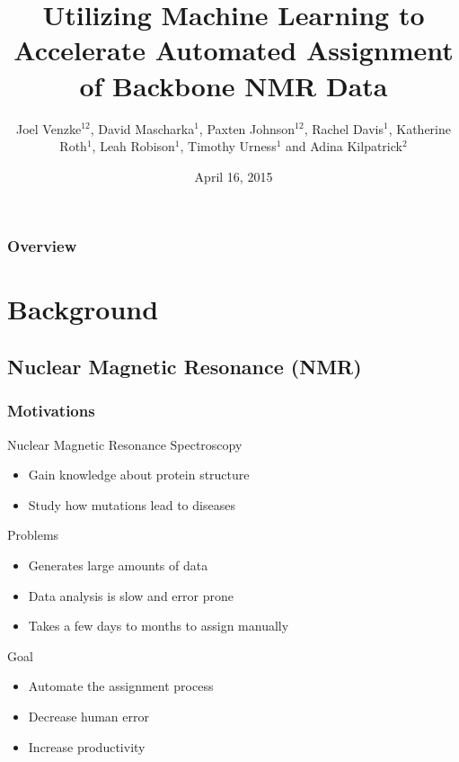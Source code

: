 \documentclass{beamer}
\title[NMR Assignment with Machine Learning]{Utilizing Machine Learning to Accelerate Automated
Assignment of Backbone NMR Data} %
\author[J. Venzke \\D. Mascharka \\P. Johnson \\R. Davis \\K. Roth\\ L. Robison\\ T. Urness \\A. Kilpatrick]{Joel Venzke$^{12}$, David Mascharka$^{1}$, Paxten Johnson$^{12}$, Rachel Davis$^{1}$, Katherine Roth$^{1}$,  Leah Robison$^{1}$, Timothy Urness$^{1}$ and Adina Kilpatrick$^{2}$} %
\institute[Drake University] %
{
$^1$Department of Mathematics and Computer Science\\
$^2$Department of Physics and Astronomy\\
Drake University\\

\medskip
\textit{joel.venzke@drake.edu} %
}
\date{April 16, 2015} %
\begin{document}
\begin{frame}
\titlepage %
\end{frame}

\begin{frame}
\frametitle{Overview} %
\tableofcontents 
\end{frame}

\section{Background}
\subsection[NMR]{Nuclear Magnetic Resonance (NMR)} 
\begin{frame}
	\frametitle{Motivations}
	\begin{block} {Nuclear Magnetic Resonance Spectroscopy}
		\begin{itemize}
			\item Gain knowledge about protein structure
			\item Study how mutations lead to diseases
		\end{itemize}
	\end{block}
		\vspace{-10pt}
	\begin{block}{Problems}
		\begin{itemize}
			\item Generates large amounts of data
			\item Data analysis is slow and error prone 
			\item Takes a few days to months to assign manually\autocite{aria}
		\end{itemize}
	\end{block}
	\vspace{-10pt}
	\begin{block}{Goal}
		\begin{itemize}
			\item Automate the assignment process
			\item Decrease human error
			\item Increase productivity
		\end{itemize}
	\end{block}
\end{frame}
\end{document}
